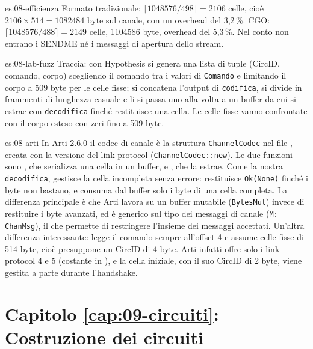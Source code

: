 \begin{soluzione}{es:08-efficienza}
Formato tradizionale: $\lceil 1048576/498 \rceil = 2106$ celle, cioè $2106 \times 514 = \num{1082484}$ byte sul canale, con un overhead del 3,2\,\%. CGO: $\lceil 1048576/488 \rceil = 2149$ celle, \num{1104586} byte, overhead del 5,3\,\%. Nel conto non entrano i SENDME né i messaggi di apertura dello stream.
\end{soluzione}

\begin{soluzione}{es:08-lab-fuzz}
Traccia: con Hypothesis si genera una lista di tuple (CircID, comando, corpo) scegliendo il comando tra i valori di \texttt{Comando} e limitando il corpo a 509 byte per le celle fisse; si concatena l'output di \texttt{codifica}, si divide in frammenti di lunghezza casuale e li si passa uno alla volta a un buffer da cui si estrae con \texttt{decodifica} finché restituisce una cella. Le celle fisse vanno confrontate con il corpo esteso con zeri fino a 509 byte.
\end{soluzione}

\begin{soluzione}{es:08-arti}
In Arti 2.6.0 il codec di canale è la struttura \texttt{ChannelCodec} nel file , creata con la versione del link protocol (\texttt{ChannelCodec::new}). Le due funzioni sono , che serializza una cella in un buffer, e , che la estrae. Come la nostra \texttt{decodifica},  gestisce la cella incompleta senza errore: restituisce \texttt{Ok(None)} finché i byte non bastano, e consuma dal buffer solo i byte di una cella completa. La differenza principale è che Arti lavora su un buffer mutabile (\texttt{BytesMut}) invece di restituire i byte avanzati, ed è generico sul tipo dei messaggi di canale (\texttt{M: ChanMsg}), il che permette di restringere l'insieme dei messaggi accettati. Un'altra differenza interessante:  legge il comando sempre all'offset 4 e assume celle fisse di 514 byte, cioè presuppone un CircID di 4 byte. Arti infatti offre solo i link protocol 4 e 5 (costante  in ), e la cella  iniziale, con il suo CircID di 2 byte, viene gestita a parte durante l'handshake.
\end{soluzione}

\section*{Capitolo \ref{cap:09-circuiti}: Costruzione dei circuiti}

